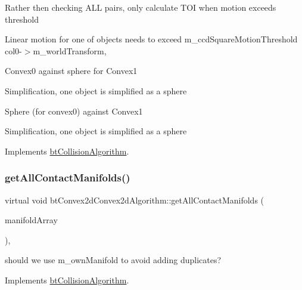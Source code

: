 Rather then checking A\+LL pairs, only calculate T\+OI when motion exceeds threshold

Linear motion for one of objects needs to exceed m\+\_\+ccd\+Square\+Motion\+Threshold col0-\/$>$m\+\_\+world\+Transform,

Convex0 against sphere for Convex1

Simplification, one object is simplified as a sphere

Sphere (for convex0) against Convex1

Simplification, one object is simplified as a sphere 

Implements \hyperlink{classbtCollisionAlgorithm}{bt\+Collision\+Algorithm}.

\mbox{\label{classbtConvex2dConvex2dAlgorithm_ade3af2f3f04d9b202535d33550a94be4}} 
\subsubsection{\texorpdfstring{get\+All\+Contact\+Manifolds()}{getAllContactManifolds()}\hspace{0.1cm}{\footnotesize\ttfamily [1/2]}}
{\footnotesize\ttfamily virtual void bt\+Convex2d\+Convex2d\+Algorithm\+::get\+All\+Contact\+Manifolds (\begin{DoxyParamCaption}\item[{\hyperlink{classbtAlignedObjectArray}{bt\+Manifold\+Array} \&}]{manifold\+Array }\end{DoxyParamCaption})\hspace{0.3cm}{\ttfamily [inline]}, {\ttfamily [virtual]}}

should we use m\+\_\+own\+Manifold to avoid adding duplicates? 

Implements \hyperlink{classbtCollisionAlgorithm}{bt\+Collision\+Algorithm}.

\mbox{\label{classbtConvex2dConvex2dAlgorithm_ade3af2f3f04d9b202535d33550a94be4}} 
